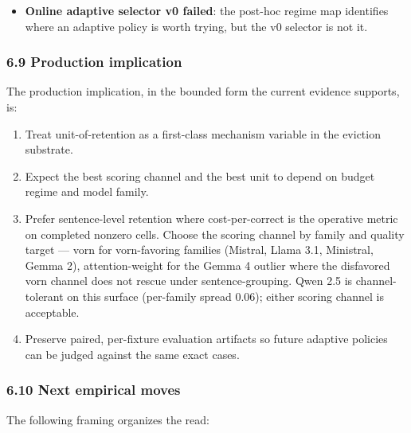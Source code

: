 \documentclass[
]{article}
\providecommand{\tightlist}{%
  \setlength{\itemsep}{0pt}\setlength{\parskip}{0pt}}
\begin{document}
\begin{itemize}
\tightlist
\item
  \textbf{Online adaptive selector v0 failed}: the post-hoc regime map
  identifies where an adaptive policy is worth trying, but the v0
  selector is not it.
\end{itemize}

\subsubsection{6.9 Production
implication}\label{69-production-implication}

The production implication, in the bounded form the current evidence
supports, is:

\begin{enumerate}
\def\labelenumi{\arabic{enumi}.}
\tightlist
\item
  Treat unit-of-retention as a first-class mechanism variable in the
  eviction substrate.
\item
  Expect the best scoring channel and the best unit to depend on budget
  regime and model family.
\item
  Prefer sentence-level retention where cost-per-correct is the
  operative metric on completed nonzero cells. Choose the scoring
  channel by family and quality target --- vorn for vorn-favoring
  families (Mistral, Llama 3.1, Ministral, Gemma 2), attention-weight
  for the Gemma 4 outlier where the disfavored vorn channel does not
  rescue under sentence-grouping. Qwen 2.5 is channel-tolerant on this
  surface (per-family spread 0.06); either scoring channel is
  acceptable.
\item
  Preserve paired, per-fixture evaluation artifacts so future adaptive
  policies can be judged against the same exact cases.
\end{enumerate}

\subsubsection{6.10 Next empirical
moves}\label{610-next-empirical-moves}

The following framing organizes the read:
\end{document}
